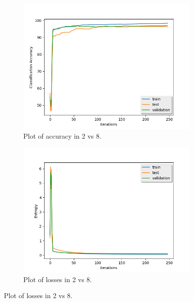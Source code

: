 \documentclass{article} %
\begin{document}
\begin{figure}[H]
\centering
\begin{subfigure}{.5\textwidth}
	\centering
	\includegraphics[width=1.05\linewidth]{plt_2vs8_accuracy.png}
	\caption{Plot of accuracy in 2 vs 8.}
\end{subfigure}%
\begin{subfigure}{.5\textwidth}
	\centering
	\includegraphics[width=1.05\linewidth]{plt_2vs8_losses.png}
	\caption{Plot of losses in 2 vs 8.}
\end{subfigure}
\end{figure}
\end{document}
